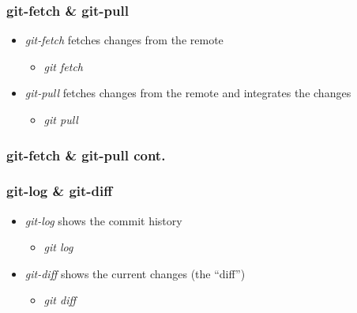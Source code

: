 \documentclass{beamer}
\begin{document}
\begin{frame}
  \frametitle{git-fetch \& git-pull}
  \begin{itemize}
  \item<1-> \textit{git-fetch} fetches changes from the remote
    \begin{itemize}
    \item<2->[] \textit{git fetch}
    \end{itemize}
  \item<3-> \textit{git-pull} fetches changes from the remote and integrates the changes
    \begin{itemize}
    \item<4->[] \textit{git pull}
    \end{itemize}
  \end{itemize}
\end{frame}

\begin{frame}
  \frametitle{git-fetch \& git-pull cont.}
  {\centering
  }
\end{frame}

\begin{frame}
  \frametitle{git-log \& git-diff}
  \begin{itemize}
  \item<1-> \textit{git-log} shows the commit history
    \begin{itemize}
    \item<1->[] \textit{git log}
    \end{itemize}
  \item<1-> \textit{git-diff} shows the current changes (the ``diff'')
    \begin{itemize}
    \item<1->[] \textit{git diff}
    \end{itemize}
  \end{itemize}
\end{frame}
\end{document}
